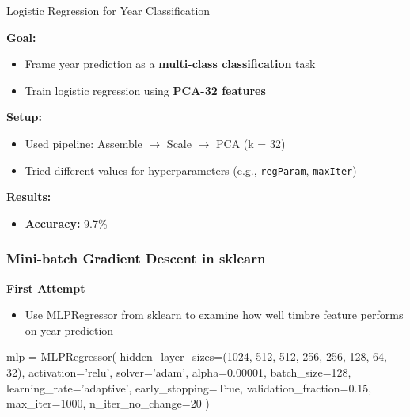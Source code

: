\documentclass{beamer}
\begin{document}
\begin{frame}{Logistic Regression for Year Classification}

\textbf{Goal:}
\begin{itemize}
    \item Frame year prediction as a \textbf{multi-class classification} task
    \item Train logistic regression using \textbf{PCA-32 features}
\end{itemize}

\textbf{Setup:}
\begin{itemize}
    \item Used pipeline: Assemble $\rightarrow$ Scale $\rightarrow$ PCA (k = 32)
    \item Tried different values for hyperparameters (e.g., \texttt{regParam}, \texttt{maxIter})
\end{itemize}

\textbf{Results:}
\begin{itemize}
    \item \textbf{Accuracy:} 9.7\%
\end{itemize}


\end{frame}






	



	

		

\begin{frame}[fragile]
    \frametitle{Mini-batch Gradient Descent in sklearn}
    \textbf{First Attempt}
    \begin{itemize}
        \item Use MLPRegressor from sklearn to examine how well timbre feature performs on year prediction
    \end{itemize}
    
    \begin{mycodetiny}
        mlp = MLPRegressor(
            hidden_layer_sizes=(1024, 512, 512, 256, 256, 128, 64, 32),
            activation='relu',
            solver='adam',
            alpha=0.00001,
            batch_size=128,
            learning_rate='adaptive',
            early_stopping=True,
            validation_fraction=0.15,
            max_iter=1000,
            n_iter_no_change=20
        )
    \end{mycodetiny}
\end{frame}
\end{document}
